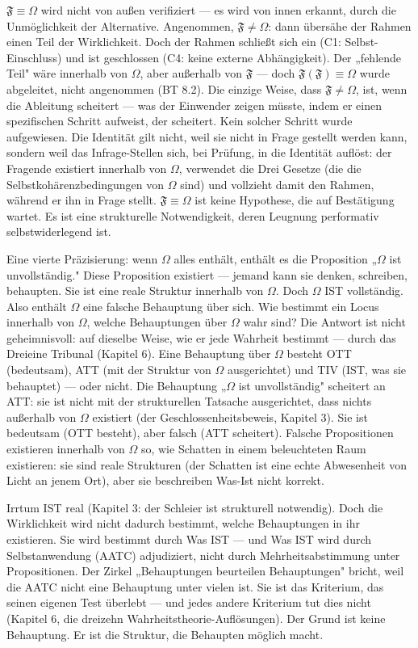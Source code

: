\documentclass[10pt, openany, oneside]{book}
\begin{document}
$\mathfrak{F} \equiv \Omega$ wird nicht von außen verifiziert --- es wird von innen erkannt, durch die Unmöglichkeit der Alternative. Angenommen, $\mathfrak{F} \neq \Omega$: dann übersähe der Rahmen einen Teil der Wirklichkeit. Doch der Rahmen schließt sich ein (C1: Selbst-Einschluss) und ist geschlossen (C4: keine externe Abhängigkeit). Der „fehlende Teil" wäre innerhalb von $\Omega$, aber außerhalb von $\mathfrak{F}$ --- doch $\mathfrak{F}(\mathfrak{F}) \equiv \Omega$ wurde abgeleitet, nicht angenommen (BT 8.2). Die einzige Weise, dass $\mathfrak{F} \neq \Omega$, ist, wenn die Ableitung scheitert --- was der Einwender zeigen müsste, indem er einen spezifischen Schritt aufweist, der scheitert. Kein solcher Schritt wurde aufgewiesen. Die Identität gilt nicht, weil sie nicht in Frage gestellt werden kann, sondern weil das Infrage-Stellen sich, bei Prüfung, in die Identität auflöst: der Fragende existiert innerhalb von $\Omega$, verwendet die Drei Gesetze (die die Selbstkohärenzbedingungen von $\Omega$ sind) und vollzieht damit den Rahmen, während er ihn in Frage stellt. $\mathfrak{F} \equiv \Omega$ ist keine Hypothese, die auf Bestätigung wartet. Es ist eine strukturelle Notwendigkeit, deren Leugnung performativ selbstwiderlegend ist.

Eine vierte Präzisierung: wenn $\Omega$ alles enthält, enthält es die Proposition „$\Omega$ ist unvollständig." Diese Proposition existiert --- jemand kann sie denken, schreiben, behaupten. Sie ist eine reale Struktur innerhalb von $\Omega$. Doch $\Omega$ IST vollständig. Also enthält $\Omega$ eine falsche Behauptung über sich. Wie bestimmt ein Locus innerhalb von $\Omega$, welche Behauptungen über $\Omega$ wahr sind? Die Antwort ist nicht geheimnisvoll: auf dieselbe Weise, wie er jede Wahrheit bestimmt --- durch das Dreieine Tribunal (Kapitel 6). Eine Behauptung über $\Omega$ besteht OTT (bedeutsam), ATT (mit der Struktur von $\Omega$ ausgerichtet) und TIV (IST, was sie behauptet) --- oder nicht. Die Behauptung „$\Omega$ ist unvollständig" scheitert an ATT: sie ist nicht mit der strukturellen Tatsache ausgerichtet, dass nichts außerhalb von $\Omega$ existiert (der Geschlossenheitsbeweis, Kapitel 3). Sie ist bedeutsam (OTT besteht), aber falsch (ATT scheitert). Falsche Propositionen existieren innerhalb von $\Omega$ so, wie Schatten in einem beleuchteten Raum existieren: sie sind reale Strukturen (der Schatten ist eine echte Abwesenheit von Licht an jenem Ort), aber sie beschreiben Was-Ist nicht korrekt.

Irrtum IST real (Kapitel 3: der Schleier ist strukturell notwendig). Doch die Wirklichkeit wird nicht dadurch bestimmt, welche Behauptungen in ihr existieren. Sie wird bestimmt durch Was IST --- und Was IST wird durch Selbstanwendung (AATC) adjudiziert, nicht durch Mehrheitsabstimmung unter Propositionen. Der Zirkel „Behauptungen beurteilen Behauptungen" bricht, weil die AATC nicht eine Behauptung unter vielen ist. Sie ist das Kriterium, das seinen eigenen Test überlebt --- und jedes andere Kriterium tut dies nicht (Kapitel 6, die dreizehn Wahrheitstheorie-Auflösungen). Der Grund ist keine Behauptung. Er ist die Struktur, die Behaupten möglich macht.
\end{document}

